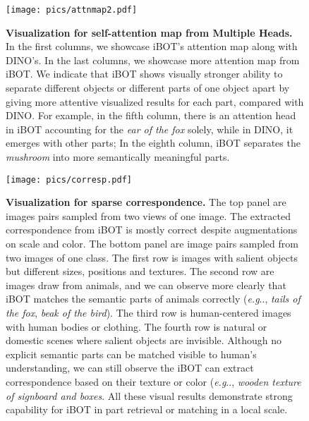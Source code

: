 \documentclass{article} \usepackage{iclr2022_conference,times}
\makeatletter
\def\ourmethod{{iBOT}\xspace}
\DeclareRobustCommand\onedot{\futurelet\@let@token\@onedot}
\def\@onedot{\ifx\@let@token.\else.\null\fi\xspace}
\def\eg{\emph{e.g}\onedot} \def\Eg{\emph{E.g}\onedot}
\makeatother
\begin{document}
\begin{figure}[!t]
\centering
\texttt{[image: pics/attnmap2.pdf]}
\vspace{-0.2cm}
\caption{\textbf{Visualization for self-attention map from Multiple Heads.} 
In the first  columns, we showcase \ourmethod's attention map along with DINO's. In the last  columns, we showcase more attention map from \ourmethod.
We indicate that \ourmethod shows visually stronger ability to separate different objects or different parts of one object apart by giving more attentive visualized results for each part, compared with DINO. 
For example, in the fifth column, there is an attention head in \ourmethod accounting for the \textit{ear of the fox} solely, while in DINO, it emerges with other parts; In the eighth column, \ourmethod separates the \textit{mushroom} into more semantically meaningful parts.
}
\vspace{-0.2cm}
\label{fig:attnmap2}
\end{figure}



\begin{figure}[!t]
\centering
\texttt{[image: pics/corresp.pdf]}
\vspace{-0.2cm}
\caption{\textbf{Visualization for sparse correspondence.} 
The top panel are images pairs sampled from two views of one image. The extracted correspondence from \ourmethod is mostly correct despite augmentations on scale and color.
The bottom panel are image pairs sampled from two images of one class. The first row is images with salient objects but different sizes, positions and textures. The second row are images draw from animals, and we can observe more clearly that \ourmethod matches the semantic parts of animals correctly (\eg, \textit{tails of the fox}, \textit{beak of the bird}). The third row is human-centered images with human bodies or clothing. The fourth row is natural or domestic scenes where salient objects are invisible. Although no explicit semantic parts can be matched visible to human's understanding, we can still observe the \ourmethod can extract correspondence based on their texture or color (\eg, \textit{wooden texture of signboard and boxes}. All these visual results demonstrate strong capability for \ourmethod in part retrieval or matching in a local scale.}
\vspace{-0.2cm}
\label{fig:corresp}
\end{figure}
\end{document}
